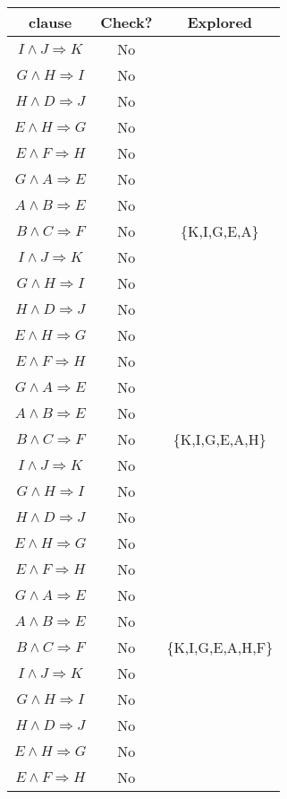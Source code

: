 \documentclass[12pt]{article}
\begin{document}
\begin{table}[H]
\small
\centering
\label{table:example}
\begin{tabular}
{|c|c|c|}	%
\hline 							%
\textbf{clause} & \textbf{Check?} & \textbf{Explored}\\
\hline
$I \wedge J \Rightarrow K$ & No &\\
$G \wedge H \Rightarrow I$ & No &\\
$H \wedge D \Rightarrow J$ & No &\\
$E \wedge H \Rightarrow G$ & No &\\
$E \wedge F \Rightarrow H$ & No &\\
$G \wedge A \Rightarrow E$ & No &\\
$A \wedge B \Rightarrow E$ & No &\\
$B \wedge C \Rightarrow F$ & No & \{K,I,G,E,A\}\\
\hline
$I \wedge J \Rightarrow K$ & No &\\
$G \wedge H \Rightarrow I$ & No &\\
$H \wedge D \Rightarrow J$ & No &\\
$E \wedge H \Rightarrow G$ & No &\\
$E \wedge F \Rightarrow H$ & No &\\
$G \wedge A \Rightarrow E$ & No &\\
$A \wedge B \Rightarrow E$ & No &\\
$B \wedge C \Rightarrow F$ & No & \{K,I,G,E,A,H\}\\
\hline
$I \wedge J \Rightarrow K$ & No &\\
$G \wedge H \Rightarrow I$ & No &\\
$H \wedge D \Rightarrow J$ & No &\\
$E \wedge H \Rightarrow G$ & No &\\
$E \wedge F \Rightarrow H$ & No &\\
$G \wedge A \Rightarrow E$ & No &\\
$A \wedge B \Rightarrow E$ & No &\\
$B \wedge C \Rightarrow F$ & No & \{K,I,G,E,A,H,F\}\\
\hline
$I \wedge J \Rightarrow K$ & No &\\
$G \wedge H \Rightarrow I$ & No &\\
$H \wedge D \Rightarrow J$ & No &\\
$E \wedge H \Rightarrow G$ & No &\\
$E \wedge F \Rightarrow H$ & No &\\

\end{tabular}
\end{table}
\end{document}
